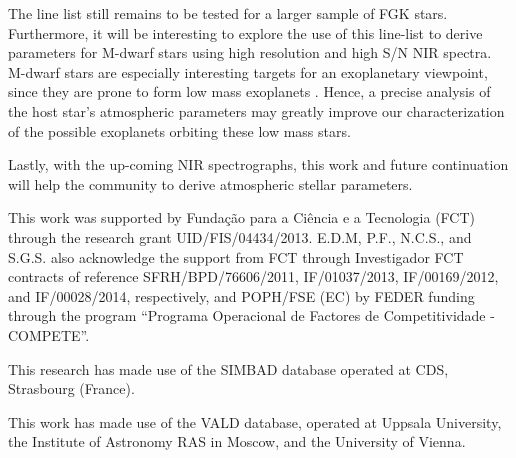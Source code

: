 \documentclass{aa}
\begin{document}
The line list still remains to be tested for a larger sample of FGK
stars. Furthermore, it will be interesting to explore the use of this
line-list to derive parameters for M-dwarf stars using high resolution
and high S/N NIR spectra. M-dwarf stars are especially interesting
targets for an exoplanetary viewpoint, since they are prone to form
low mass exoplanets \citep{Bonfils2013}. Hence, a precise analysis
of the host star's atmospheric parameters may greatly improve our
characterization of the possible exoplanets orbiting these low mass
stars.

Lastly, with the up-coming NIR spectrographs, this work and future
continuation will help the community to derive atmospheric stellar
parameters.





\begin{acknowledgements}

This work was supported by Funda\c{c}\~ao para a Ci\^encia e a
Tecnologia (FCT) through the research grant UID/FIS/04434/2013.
E.D.M, P.F., N.C.S., and S.G.S. also acknowledge the support from FCT
through Investigador FCT contracts of reference SFRH/BPD/76606/2011,
IF/01037/2013, IF/00169/2012, and IF/00028/2014, respectively, and
POPH/FSE (EC) by FEDER funding through the program “Programa
Operacional de Factores de Competitividade - COMPETE”.

This research has made use of the SIMBAD database operated at CDS,
Strasbourg (France).

This work has made use of the VALD database, operated at Uppsala
University, the Institute of Astronomy RAS in Moscow, and the University
of Vienna.

\end{acknowledgements}








\end{document}
